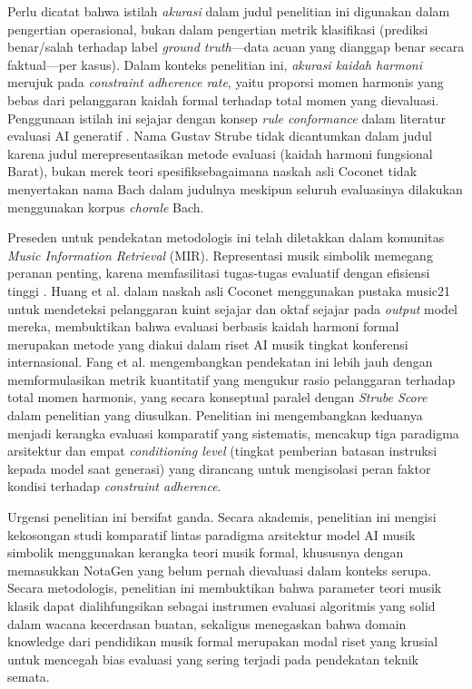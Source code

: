 Perlu dicatat bahwa istilah \textit{akurasi} dalam judul penelitian ini digunakan dalam pengertian operasional, bukan dalam pengertian metrik klasifikasi (prediksi benar/salah terhadap label \textit{ground truth}---data acuan yang dianggap benar secara faktual---per kasus). Dalam konteks penelitian ini, \textit{akurasi kaidah harmoni} merujuk pada \textit{constraint adherence rate}, yaitu proporsi momen harmonis yang bebas dari pelanggaran kaidah formal terhadap total momen yang dievaluasi. Penggunaan istilah ini sejajar dengan konsep \textit{rule conformance} dalam literatur evaluasi AI generatif \parencite{fang2020, le2025}. Nama Gustav Strube tidak dicantumkan dalam judul karena judul merepresentasikan metode evaluasi (kaidah harmoni fungsional Barat), bukan merek teori spesifik\textemdash sebagaimana naskah asli Coconet \parencite{huang2017} tidak menyertakan nama Bach dalam judulnya meskipun seluruh evaluasinya dilakukan menggunakan korpus \textit{chorale} Bach.

Preseden untuk pendekatan metodologis ini telah diletakkan dalam komunitas \textit{Music Information Retrieval} (MIR). Representasi musik simbolik memegang peranan penting, karena memfasilitasi tugas-tugas evaluatif dengan efisiensi tinggi \parencite{Zhang2023, Chen2020}. Huang et al. \parencite{huang2017} dalam naskah asli Coconet menggunakan pustaka music21 untuk mendeteksi pelanggaran kuint sejajar dan oktaf sejajar pada \textit{output} model mereka, membuktikan bahwa evaluasi berbasis kaidah harmoni formal merupakan metode yang diakui dalam riset AI musik tingkat konferensi internasional. Fang et al. \parencite{fang2020} mengembangkan pendekatan ini lebih jauh dengan memformulasikan metrik kuantitatif yang mengukur rasio pelanggaran terhadap total momen harmonis, yang secara konseptual paralel dengan \textit{Strube Score} dalam penelitian yang diusulkan. Penelitian ini mengembangkan keduanya menjadi kerangka evaluasi komparatif yang sistematis, mencakup tiga paradigma arsitektur dan empat \textit{conditioning level} (tingkat pemberian batasan instruksi kepada model saat generasi) yang dirancang untuk mengisolasi peran faktor kondisi terhadap \textit{constraint adherence}.

Urgensi penelitian ini bersifat ganda. Secara akademis, penelitian ini mengisi kekosongan studi komparatif lintas paradigma arsitektur model AI musik simbolik menggunakan kerangka teori musik formal, khususnya dengan memasukkan NotaGen \parencite{wang2025} yang belum pernah dievaluasi dalam konteks serupa. Secara metodologis, penelitian ini membuktikan bahwa parameter teori musik klasik dapat dialihfungsikan sebagai instrumen evaluasi algoritmis yang solid dalam wacana kecerdasan buatan, sekaligus menegaskan bahwa domain knowledge dari pendidikan musik formal merupakan modal riset yang krusial untuk mencegah bias evaluasi yang sering terjadi pada pendekatan teknik semata.

